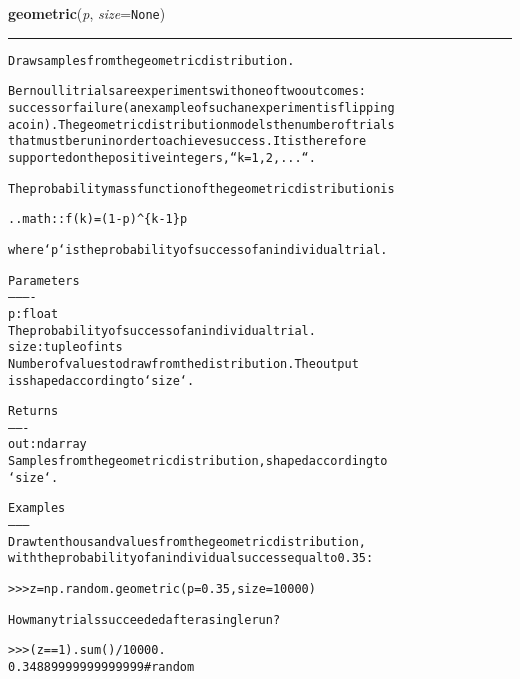 \hspace{.8\funcindent}\begin{boxedminipage}{\funcwidth}

    \raggedright \textbf{geometric}(\textit{p}, \textit{size}={\tt None})

    \vspace{-1.5ex}

    \rule{\textwidth}{0.5\fboxrule}
\setlength{\parskip}{2ex}
\begin{alltt}
Draw samples from the geometric distribution.

Bernoulli trials are experiments with one of two outcomes:
success or failure (an example of such an experiment is flipping
a coin).  The geometric distribution models the number of trials
that must be run in order to achieve success.  It is therefore
supported on the positive integers, ``k = 1, 2, ...``.

The probability mass function of the geometric distribution is

.. math:: f(k) = (1 - p){\textasciicircum}\{k - 1\} p

where `p` is the probability of success of an individual trial.

Parameters
----------
p : float
    The probability of success of an individual trial.
size : tuple of ints
    Number of values to draw from the distribution.  The output
    is shaped according to `size`.

Returns
-------
out : ndarray
    Samples from the geometric distribution, shaped according to
    `size`.

Examples
--------
Draw ten thousand values from the geometric distribution,
with the probability of an individual success equal to 0.35:

{\textgreater}{\textgreater}{\textgreater} z = np.random.geometric(p=0.35, size=10000)

How many trials succeeded after a single run?

{\textgreater}{\textgreater}{\textgreater} (z == 1).sum() / 10000.
0.34889999999999999 \#random
\end{alltt}

\setlength{\parskip}{1ex}
    \end{boxedminipage}

    \label{trunk:qstkutil:bollinger:get_state}

